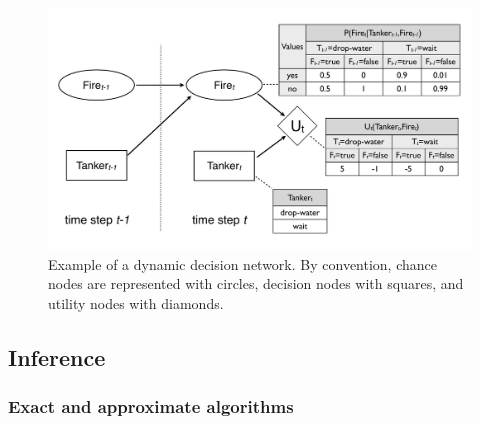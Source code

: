 \begin{figure}[h]
\centering
\includegraphics[scale=0.25]{imgs/ddn.pdf}
\caption{Example of a dynamic decision network. By convention, chance nodes are represented with circles, decision nodes with squares, and utility nodes with diamonds. }
\label{fig:ddn}
\end{figure}


\subsection{Inference} 
\label{sec:inference}
\subsubsection*{Exact and approximate algorithms}

